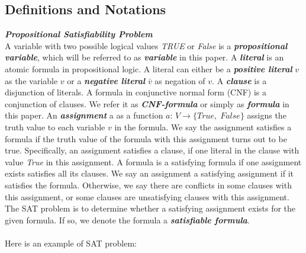 \documentclass[12pt,a4paper,twoside]{scrartcl}
\numberwithin{equation}{section}
\begin{document}
\subsection{Definitions and Notations} 
\emph{\textbf{Propositional Satisfiability Problem}}\\
A variable with two possible logical values  \textit{TRUE} or  \textit{False} is a \emph{\textbf{propositional variable}}, which will be referred to as \emph{\textbf{variable}} in this paper.
A \emph{\textbf{literal}} is an atomic formula in propositional logic. A literal can either be a \emph{\textbf{positive literal}} $v$ as the variable $v$ or a \emph{\textbf{negative literal}} $\bar{v}$ as negation of $v$.
A \emph{\textbf{clause}} is a disjunction of literals. A formula in conjunctive normal form (CNF) is a conjunction of clauses. We refer it as  \emph{\textbf{CNF-formula}} or simply as \emph{\textbf{formula}} in this paper.
An \emph{\textbf{assignment}} a as a function  $a$: $V\rightarrow \{True {, }\; False\}$ assigns the truth value to each variable $v$ in the formula. We say the assignment satisfies a formula if the truth value of the formula with this assignment turns out to be true. Specifically, an assignment satisfies a clause, if one literal in the clause with value  \textit{True} in this assignment. A formula is a satisfying formula if one assignment exists satisfies all its clauses. We say an assignment a satisfying assignment if it satisfies the formula. Otherwise, we say there are conflicts in some clauses with this assignment, or some clauses are unsatisfying clauses with this assignment. 
The SAT problem is to determine whether a satisfying assignment exists for the given formula. If so, we denote the formula a \emph{\textbf{satisfiable formula}}. \\
\\
Here is an example of SAT problem:
\end{document}
